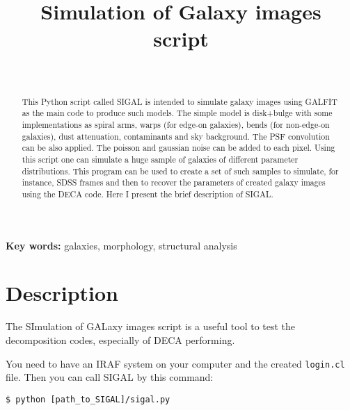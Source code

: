 \documentclass[
aps,%
12pt,%
final,%
notitlepage,%
oneside,%
onecolumn,%
nobibnotes,%
nofootinbib,%
superscriptaddress,%
noshowpacs,%
centertags]%
{revtex4}
\begin{document}

\title{Simulation of Galaxy images\\script}%

\author{~}
%
%


\begin{abstract}

This Python script called SIGAL is intended to simulate galaxy images using GALFIT as the main code to produce such models. The simple model is disk+bulge with some implementations as spiral arms, warps (for edge-on galaxies), bends (for non-edge-on galaxies), dust attenuation, contaminants and sky background. The PSF convolution can be also applied. The poisson and gaussian noise can be added to each pixel. Using this script one can simulate a huge sample of galaxies of different parameter distributions. This program can be used to create a set of such samples to simulate, for instance, SDSS frames and then to recover the parameters of created galaxy images using the DECA code. Here I present the brief description of SIGAL.

\end{abstract}

\maketitle


\noindent
{\bf Key words:\/} galaxies, morphology, structural analysis

\section{Description}
The SImulation of GALaxy images script is a useful tool to test the decomposition codes, especially of DECA performing. 

You need to have an IRAF system on your computer and the created \texttt{login.cl} file. Then you can call SIGAL by this command:

\texttt{\$ python [path\_to\_SIGAL]/sigal.py}
\end{document}
